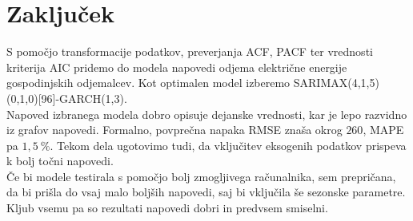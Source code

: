 \documentclass[a4paper, 11pt]{article}
\begin{document}

\section{Zaključek}

\noindent S pomočjo transformacije podatkov, preverjanja ACF, PACF ter vrednosti kriterija AIC pridemo do 
modela napovedi odjema električne energije gospodinjskih odjemalcev. 
Kot optimalen model izberemo SARIMAX(4,1,5)(0,1,0)[96]-GARCH(1,3). \\

\noindent Napoved izbranega modela dobro opisuje dejanske vrednosti, kar je lepo razvidno iz grafov napovedi. 
Formalno, povprečna napaka RMSE znaša okrog $260$, 
MAPE pa $1{,}5~\%$. Tekom dela ugotovimo tudi, da vključitev eksogenih podatkov prispeva k bolj točni napovedi. \\

\noindent Če bi modele testirala s pomočjo bolj zmogljivega računalnika, sem prepričana, da bi prišla do vsaj malo boljših
napovedi, saj bi vključila še sezonske parametre. 
Kljub vsemu pa so rezultati napovedi dobri in predvsem smiselni.



{\small

}
\end{document}
